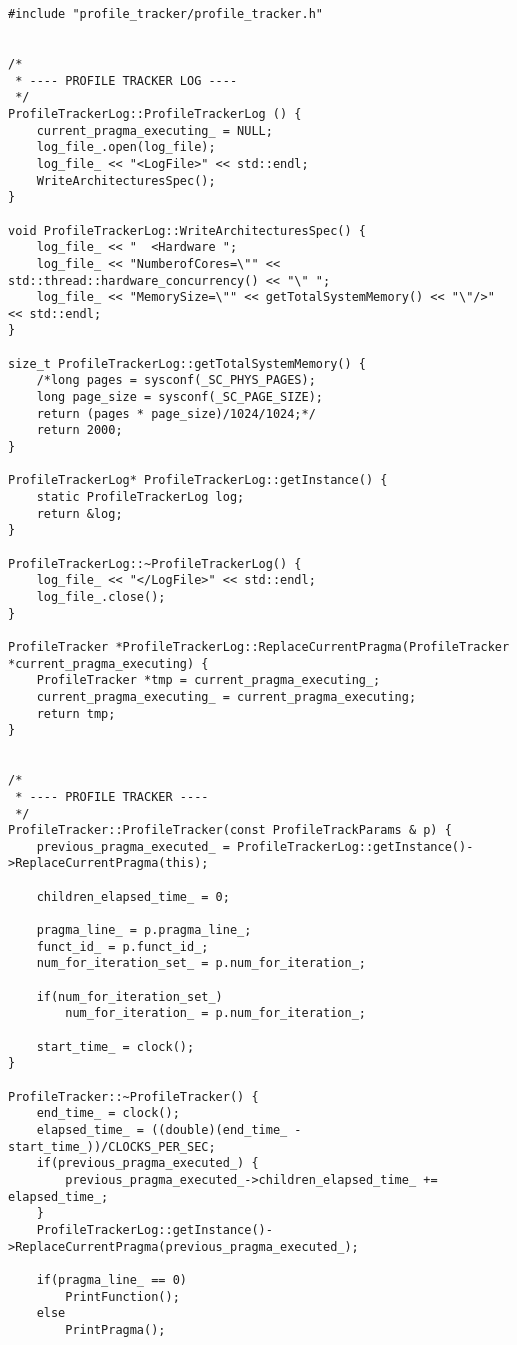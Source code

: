 \documentclass[a4paper,11pt,twoside]{book}
\begin{document}
\begin{lstlisting}[language=CCC, caption=profile\_tracker.cpp]
#include "profile_tracker/profile_tracker.h"


/*
 * ---- PROFILE TRACKER LOG ----
 */
ProfileTrackerLog::ProfileTrackerLog () {
	current_pragma_executing_ = NULL;
	log_file_.open(log_file);
	log_file_ << "<LogFile>" << std::endl;
	WriteArchitecturesSpec();
}

void ProfileTrackerLog::WriteArchitecturesSpec() {
	log_file_ << "	<Hardware ";
	log_file_ << "NumberofCores=\"" << std::thread::hardware_concurrency() << "\" ";
  	log_file_ << "MemorySize=\"" << getTotalSystemMemory() << "\"/>" << std::endl;
}	

size_t ProfileTrackerLog::getTotalSystemMemory() {
   	/*long pages = sysconf(_SC_PHYS_PAGES);
   	long page_size = sysconf(_SC_PAGE_SIZE);
   	return (pages * page_size)/1024/1024;*/
   	return 2000;
}

ProfileTrackerLog* ProfileTrackerLog::getInstance() {
    static ProfileTrackerLog log;
    return &log;
}

ProfileTrackerLog::~ProfileTrackerLog() {
	log_file_ << "</LogFile>" << std::endl;
	log_file_.close();
}

ProfileTracker *ProfileTrackerLog::ReplaceCurrentPragma(ProfileTracker *current_pragma_executing) {
	ProfileTracker *tmp = current_pragma_executing_;
	current_pragma_executing_ = current_pragma_executing;
	return tmp;
}


/* 
 * ---- PROFILE TRACKER ----
 */
ProfileTracker::ProfileTracker(const ProfileTrackParams & p) {
	previous_pragma_executed_ = ProfileTrackerLog::getInstance()->ReplaceCurrentPragma(this);

	children_elapsed_time_ = 0;	

	pragma_line_ = p.pragma_line_;
	funct_id_ = p.funct_id_;
	num_for_iteration_set_ = p.num_for_iteration_;

	if(num_for_iteration_set_)
		num_for_iteration_ = p.num_for_iteration_;

	start_time_ = clock();
}

ProfileTracker::~ProfileTracker() {
	end_time_ = clock();
	elapsed_time_ = ((double)(end_time_ - start_time_))/CLOCKS_PER_SEC;
	if(previous_pragma_executed_) {
		previous_pragma_executed_->children_elapsed_time_ += elapsed_time_;
	}	
	ProfileTrackerLog::getInstance()->ReplaceCurrentPragma(previous_pragma_executed_);

	if(pragma_line_ == 0)
		PrintFunction();
	else
		PrintPragma();


\end{lstlisting}
\end{document}
